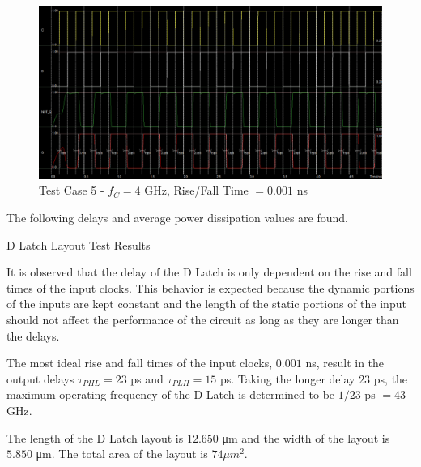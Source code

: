 \FloatBarrier

\begin{figure}[h!]
	\centering
	\includegraphics[scale=0.30]{../images/4ghz_test_case_1.PNG}
	\caption{Test Case 5 - $f_C = 4$ \si{\giga\hertz}, Rise/Fall Time $= 0.001$ \si{\nano\second}}
	\label{fig:layout_test_5}
\end{figure}

\FloatBarrier

The following delays and average power dissipation values are found.

\FloatBarrier

\begin{table}[h!]
	\centering
	\caption{D Latch Layout Test Results}
	\label{tab:dlatch_test_results}
\end{table}

\FloatBarrier

It is observed that the delay of the D Latch is only dependent on the rise and fall times of the input clocks.
This behavior is expected because the dynamic portions of the inputs are kept constant and the length of the static portions of the input should not affect the performance of the circuit as long as they are longer than the delays.

The most ideal rise and fall times of the input clocks, $0.001$ \si{\nano\second}, result in the output delays $\tau_{PHL} = 23$ \si{\pico\second} and $\tau_{PLH} = 15$ \si{\pico\second}.
Taking the longer delay $23$ \si{\pico\second}, the maximum operating frequency of the D Latch is determined to be $1/23$ \si{\pico\second} $= 43$ \si{\giga\hertz}.

The length of the D Latch layout is $12.650$ \si{\micro\meter} and the width of the layout is $5.850$ \si{\micro\meter}. The total area of the layout is $74 \mu m^2$.

\FloatBarrier

